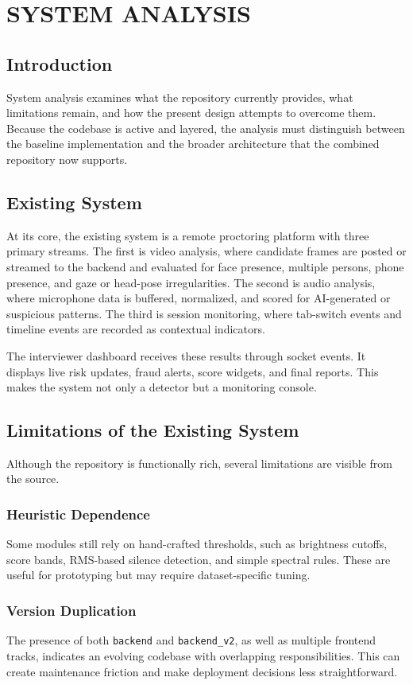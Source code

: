 \documentclass[12pt,a4paper]{extreport}
\begin{document}
\chapter{SYSTEM ANALYSIS}
\section{Introduction}
System analysis examines what the repository currently provides, what limitations remain, and how the present design attempts to overcome them. Because the codebase is active and layered, the analysis must distinguish between the baseline implementation and the broader architecture that the combined repository now supports.

\section{Existing System}
At its core, the existing system is a remote proctoring platform with three primary streams. The first is video analysis, where candidate frames are posted or streamed to the backend and evaluated for face presence, multiple persons, phone presence, and gaze or head-pose irregularities. The second is audio analysis, where microphone data is buffered, normalized, and scored for AI-generated or suspicious patterns. The third is session monitoring, where tab-switch events and timeline events are recorded as contextual indicators.

The interviewer dashboard receives these results through socket events. It displays live risk updates, fraud alerts, score widgets, and final reports. This makes the system not only a detector but a monitoring console.

\section{Limitations of the Existing System}
Although the repository is functionally rich, several limitations are visible from the source.

\subsection{Heuristic Dependence}
Some modules still rely on hand-crafted thresholds, such as brightness cutoffs, score bands, RMS-based silence detection, and simple spectral rules. These are useful for prototyping but may require dataset-specific tuning.

\subsection{Version Duplication}
The presence of both \texttt{backend} and \texttt{backend\_v2}, as well as multiple frontend tracks, indicates an evolving codebase with overlapping responsibilities. This can create maintenance friction and make deployment decisions less straightforward.
\end{document}
